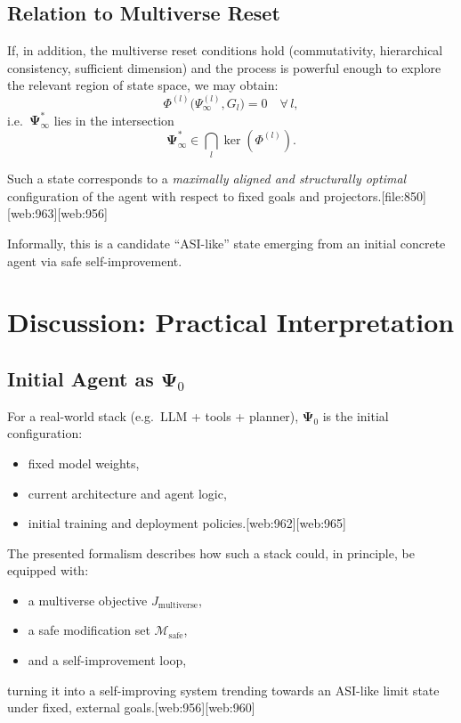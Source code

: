 \documentclass[12pt]{article}
\begin{document}
\subsection{Relation to Multiverse Reset}

If, in addition, the multiverse reset conditions hold (commutativity,
hierarchical consistency, sufficient dimension) and the process is powerful
enough to explore the relevant region of state space, we may obtain:
\[
\Phi^{(l)}\big(\Psi^{(l)}_\infty, G_l\big) = 0
\quad
\forall\, l,
\]
i.e.\ $\bm{\Psi}_\infty^*$ lies in the intersection
\[
\bm{\Psi}_\infty^* \in \bigcap_l \ker(\Phi^{(l)}).
\]

Such a state corresponds to a \emph{maximally aligned and structurally optimal}
configuration of the agent with respect to fixed goals and projectors.[file:850][web:963][web:956]

Informally, this is a candidate ``ASI-like'' state emerging from an initial
concrete agent via safe self-improvement.

\section{Discussion: Practical Interpretation}

\subsection{Initial Agent as \texorpdfstring{$\bm{\Psi}_0$}{Psi0}}

For a real-world stack (e.g.\ LLM + tools + planner), $\bm{\Psi}_0$ is
the initial configuration:
\begin{itemize}
  \item fixed model weights,
  \item current architecture and agent logic,
  \item initial training and deployment policies.[web:962][web:965]
\end{itemize}

The presented formalism describes how such a stack could, in principle,
be equipped with:
\begin{itemize}
  \item a multiverse objective $J_{\text{multiverse}}$,
  \item a safe modification set $\mathcal{M}_{\text{safe}}$,
  \item and a self-improvement loop,
\end{itemize}
turning it into a self-improving system trending towards an ASI-like
limit state under fixed, external goals.[web:956][web:960]
\end{document}
